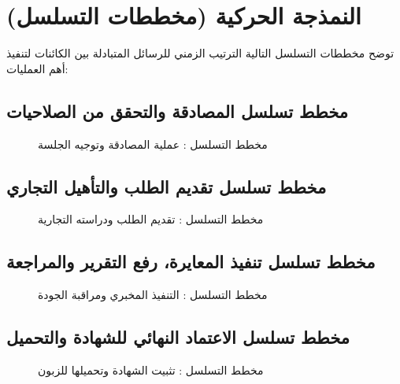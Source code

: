 \documentclass{bts-report-ar}
\begin{document}
\section{النمذجة الحركية (مخططات التسلسل)}
توضح مخططات التسلسل التالية الترتيب الزمني للرسائل المتبادلة بين الكائنات لتنفيذ أهم العمليات:

\subsection{مخطط تسلسل المصادقة والتحقق من الصلاحيات}
\begin{figure}[H]
  \centering
  \begin{LTR}
  
  \end{LTR}
  \caption{مخطط التسلسل : عملية المصادقة وتوجيه الجلسة}
  \label{fig:seq-auth}
\end{figure}

\subsection{مخطط تسلسل تقديم الطلب والتأهيل التجاري}
\begin{figure}[H]
  \centering
  \begin{LTR}
  
  \end{LTR}
  \caption{مخطط التسلسل : تقديم الطلب ودراسته التجارية}
  \label{fig:seq-request}
\end{figure}

\subsection{مخطط تسلسل تنفيذ المعايرة، رفع التقرير والمراجعة}
\begin{figure}[H]
  \centering
  \begin{LTR}
  
  \end{LTR}
  \caption{مخطط التسلسل : التنفيذ المخبري ومراقبة الجودة}
  \label{fig:seq-calibration}
\end{figure}

\subsection{مخطط تسلسل الاعتماد النهائي للشهادة والتحميل}
\begin{figure}[H]
  \centering
  \begin{LTR}
  
  \end{LTR}
  \caption{مخطط التسلسل : تثبيت الشهادة وتحميلها للزبون}
  \label{fig:seq-certificate}
\end{figure}
\end{document}
